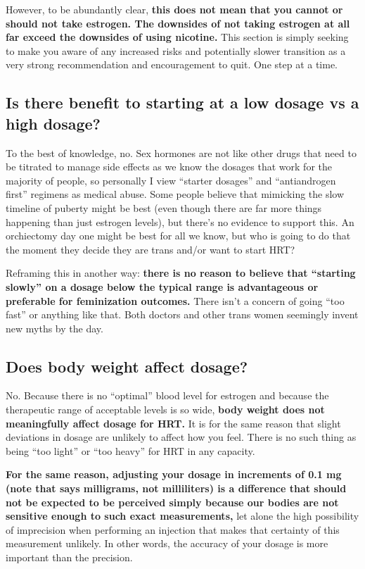 \documentclass{article}
\begin{document}
However, to be abundantly clear, \textbf{this does not mean that you cannot or should not take estrogen. The downsides of not taking estrogen at all far exceed the downsides of using nicotine.} This section is simply seeking to make you aware of any increased risks and potentially slower transition as a very strong recommendation and encouragement to quit. One step at a time.

\subsection{Is there benefit to starting at a low dosage vs a high dosage?}

To the best of knowledge, no. Sex hormones are not like other drugs that need to be titrated to manage side effects as we know the dosages that work for the majority of people, so personally I view “starter dosages” and “antiandrogen first” regimens as medical abuse. Some people believe that mimicking the slow timeline of puberty might be best (even though there are far more things happening than just estrogen levels), but there’s no evidence to support this. An orchiectomy day one might be best for all we know, but who is going to do that the moment they decide they are trans and/or want to start HRT?

Reframing this in another way: \textbf{there is no reason to believe that “starting slowly” on a dosage below the typical range is advantageous or preferable for feminization outcomes.} There isn't a concern of going “too fast” or anything like that. Both doctors and other trans women seemingly invent new myths by the day.

\subsection{Does body weight affect dosage?}

No. Because there is no “optimal” blood level for estrogen and because the therapeutic range of acceptable levels is so wide, \textbf{body weight does not meaningfully affect dosage for HRT.} It is for the same reason that slight deviations in dosage are unlikely to affect how you feel. There is no such thing as being “too light” or “too heavy” for HRT in any capacity.

\textbf{For the same reason, adjusting your dosage in increments of 0.1 mg (note that says milligrams, not milliliters) is a difference that should not be expected to be perceived simply because our bodies are not sensitive enough to such exact measurements,} let alone the high possibility of imprecision when performing an injection that makes that certainty of this measurement unlikely. In other words, the accuracy of your dosage is more important than the precision.
\end{document}
